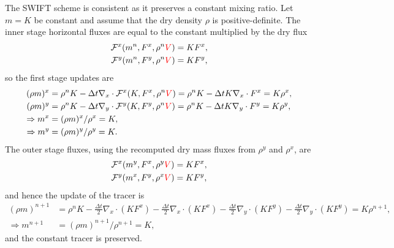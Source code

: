 \documentclass{ametsocV6.1}
\newcommand{\change}[1]{\textcolor{red}{#1}}
\begin{document}
The SWIFT scheme is consistent as it preserves a constant mixing ratio. Let $m=K$ be constant and assume that the dry density $\rho$ is positive-definite. The inner stage horizontal fluxes are equal to the constant multiplied by the dry flux
\begin{subequations}
\begin{align}   
   \mathcal{F}^x(m^n,F^{x},\rho^n\change{V}) &= K F^x, \\
   \mathcal{F}^y(m^n,F^{y},\rho^n\change{V}) &= K F^y,
\end{align}
\end{subequations}
so the first stage updates are
\begin{subequations}
\begin{align}        
    (\rho m)^x &=\rho^n K - \Delta{t} \nabla_x\cdot \mathcal{F}^x(K,F^{x},\rho^n\change{V}) = \rho^n K - \Delta{t} K \nabla_x\cdot F^x = K \rho^x, \\
    (\rho m)^y &=\rho^n K - \Delta{t} \nabla_y\cdot \mathcal{F}^y(K,F^{y},\rho^n\change{V}) = \rho^n K - \Delta{t} K \nabla_y\cdot F^y = K \rho^y, \\
    \Rightarrow m^x &= (\rho m)^x / \rho^x = K, \\
    \Rightarrow m^y &= (\rho m)^y / \rho^y = K.
\end{align}
\end{subequations}
The outer stage fluxes, using the recomputed dry mass fluxes from $\rho^y$ and $\rho^x$, are
\begin{subequations}
\begin{align}
    \mathcal{F}^x(m^y,F^{x},\rho^y\change{V}) & = K F^x, \\
    \mathcal{F}^y(m^x,F^{y},\rho^x\change{V}) & = K F^y,
\end{align}
\end{subequations}
 and hence the update of the tracer is
 \begin{subequations}
\begin{align}
    (\rho m)^{n+1} &= \rho^n K -\frac{\Delta{t}}{2}\nabla_x\cdot (K F^x) -\frac{\Delta{t}}{2}\nabla_x\cdot (K F^x) -\frac{\Delta{t}}{2}\nabla_y\cdot (K F^y) -\frac{\Delta{t}}{2}\nabla_y\cdot (K F^y) = K \rho^{n+1}, \\
    \Rightarrow m^{n+1} &=  (\rho m)^{n+1}/ \rho^{n+1} = K,
\end{align}
\end{subequations}
and the constant tracer is preserved.
\end{document}
